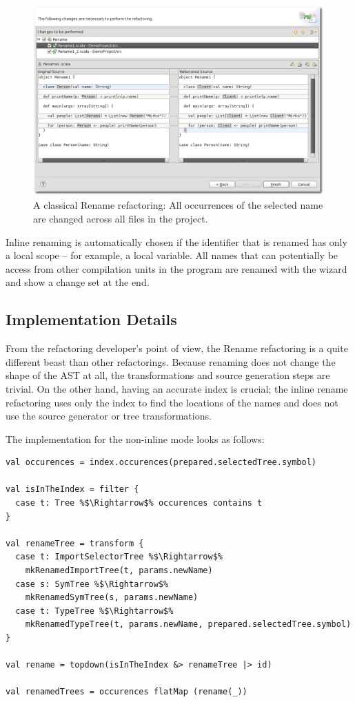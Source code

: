 \documentclass[10pt,a4paper,oneside]{scrreprt}
\begin{document}
\begin{figure}
  \centering
  \includegraphics[width=\linewidth]{rename_screenshot_2.png}
  \caption{A classical Rename refactoring: All occurrences of the selected name are changed across all files in the project.}
  \label{figure:rename-screenshot-2}
\end{figure}

Inline renaming is automatically chosen if the identifier that is renamed has only a local scope -- for example, a local variable. All names that can potentially be access from other compilation units in the program are renamed with the wizard and show a change set at the end.

\subsection{Implementation Details}

From the refactoring developer's point of view, the Rename refactoring is a quite different beast than other refactorings. Because renaming does not change the shape of the AST at all, the transformations and source generation steps are trivial. On the other hand, having an accurate index is crucial; the inline rename refactoring uses only the index to find the locations of the names and does not use the source generator or tree transformations.

The implementation for the non-inline mode looks as follows:

\begin{lstlisting}
val occurences = index.occurences(prepared.selectedTree.symbol) 
    
val isInTheIndex = filter {
  case t: Tree %$\Rightarrow$% occurences contains t 
}

val renameTree = transform {
  case t: ImportSelectorTree %$\Rightarrow$% 
    mkRenamedImportTree(t, params.newName)
  case s: SymTree %$\Rightarrow$% 
    mkRenamedSymTree(s, params.newName)
  case t: TypeTree %$\Rightarrow$% 
    mkRenamedTypeTree(t, params.newName, prepared.selectedTree.symbol)
}

val rename = topdown(isInTheIndex &> renameTree |> id)

val renamedTrees = occurences flatMap (rename(_))
\end{lstlisting}
\end{document}
